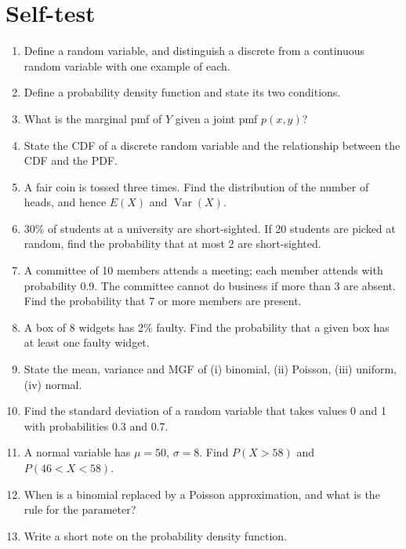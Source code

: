 \documentclass[11pt,a4paper]{article}
\begin{document}
\section{Self-test}

\begin{enumerate}
\item Define a random variable, and distinguish a discrete from a continuous random variable with one example of each.
\item Define a probability density function and state its two conditions.
\item What is the marginal pmf of $Y$ given a joint pmf $p(x,y)$?
\item State the CDF of a discrete random variable and the relationship between the CDF and the PDF.
\item A fair coin is tossed three times. Find the distribution of the number of heads, and hence $E(X)$ and $\operatorname{Var}(X)$.
\item 30\% of students at a university are short-sighted. If 20 students are picked at random, find the probability that at most 2 are short-sighted.
\item A committee of 10 members attends a meeting; each member attends with probability 0.9. The committee cannot do business if more than 3 are absent. Find the probability that 7 or more members are present.
\item A box of 8 widgets has 2\% faulty. Find the probability that a given box has at least one faulty widget.
\item State the mean, variance and MGF of (i) binomial, (ii) Poisson, (iii) uniform, (iv) normal.
\item Find the standard deviation of a random variable that takes values 0 and 1 with probabilities 0.3 and 0.7.
\item A normal variable has $\mu=50$, $\sigma=8$. Find $P(X>58)$ and $P(46<X<58)$.
\item When is a binomial replaced by a Poisson approximation, and what is the rule for the parameter?
\item Write a short note on the probability density function.
\end{enumerate}
\end{document}
